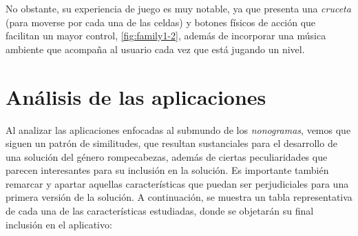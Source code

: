 No obstante, su experiencia de juego es muy notable, ya que presenta una \textit{cruceta} (para moverse por cada una de las celdas) 
y botones físicos de acción que facilitan un mayor control,
\autoref{fig:family1-2}, además de incorporar una música ambiente que acompaña al usuario cada vez que  está jugando un nivel.

\section{Análisis de las aplicaciones}

Al analizar las aplicaciones enfocadas al submundo de los \textit{nonogramas}, vemos que siguen un patrón de similitudes, que resultan sustanciales 
para el desarrollo de una solución del género rompecabezas, además de ciertas peculiaridades que parecen interesantes para su inclusión en la solución.
Es importante también remarcar y apartar aquellas características que puedan ser perjudiciales para una primera versión de la solución.
A continuación, se muestra un tabla representativa de cada una de las características estudiadas, donde se objetarán su final inclusión en el aplicativo:

